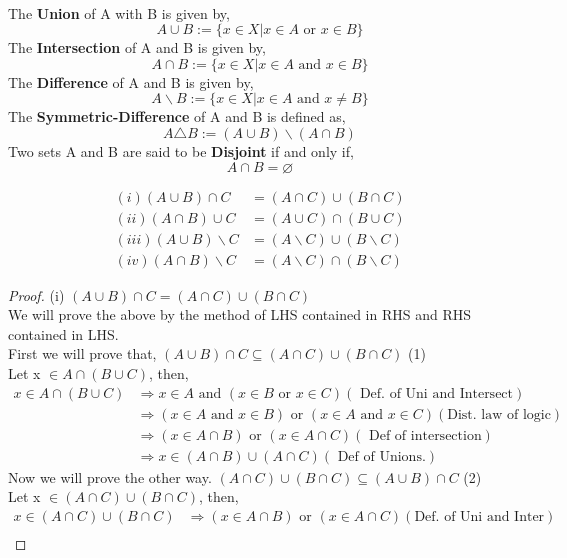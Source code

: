 \documentclass[letterpaper, 12pt]{article}
\newcommand{\1}{\mathds{1}}	%
\theoremstyle{definition}
\begin{document}
{ \\
The \textbf{Union} of A with B is given by, \[A \cup B := \{x \in X | x \in A \text{ or } x \in B\}\]
The \textbf{Intersection} of A and B is given by, \[A \cap B := \{x \in X | x \in A \text{ and } x \in B\}\]
The \textbf{Difference} of A and B is given by, \[A\backslash B:= \{x \in X | x \in A \text{ and } x \neq B\}\]
The \textbf{Symmetric-Difference} of A and B is defined as, \[A \triangle B:= (A \cup B)\backslash (A \cap B)\]
Two sets A and B are said to be \textbf{Disjoint} if and only if, \[A \cap B = \varnothing\]

\begin{align*}
    (i) (A \cup B) \cap C &= (A \cap C)\cup (B \cap C) \\
    (ii) (A \cap B) \cup C &= (A \cup C)\cap (B \cup C) \\
    (iii) (A \cup B) \backslash C &= (A \backslash C) \cup (B \backslash C) \\
    (iv) (A \cap B) \backslash C &= (A \backslash C) \cap (B \backslash C) 
\end{align*}
\begin{proof}
    (i) $(A \cup B) \cap C = (A \cap C)\cup (B \cap C)$ \\
    We will prove the above by the method of LHS contained in RHS and RHS contained in LHS. \\
    First we will prove that, $(A \cup B) \cap C \subseteq (A \cap C)\cup (B \cap C)$ (1)\\
    Let x $\in A \cap (B \cup C)$, then, 
    \begin{align*}
        x \in A \cap (B \cup C) &\Longrightarrow x \in A \text{ and } (x \in B \text{ or } x \in C)(\text{ Def. of Uni and Intersect} ) \\
        &\Longrightarrow (x \in A \text{ and } x \in B) \text{ or } (x \in A \text{ and } x \in C)(\text{Dist. law of logic}) \\
        &\Longrightarrow (x \in A \cap B) \text{ or } (x \in A \cap C) (\text{ Def of intersection}) \\
        &\Longrightarrow x \in (A \cap B) \cup (A \cap C) (\text{ Def of Unions.})
    \end{align*}
    Now we will prove the other way. 
    $(A \cap C)\cup (B \cap C) \subseteq (A \cup B) \cap C$ (2) \\
    Let x $\in (A \cap C)\cup (B \cap C)$, then, 
    \begin{align*}
        x \in (A \cap C)\cup (B \cap C) &\Longrightarrow (x \in A \cap B) \text{ or } (x \in A \cap C) (\text{Def. of Uni and Inter} ) \\ 

\end{align*}
\end{proof}}
\end{document}
